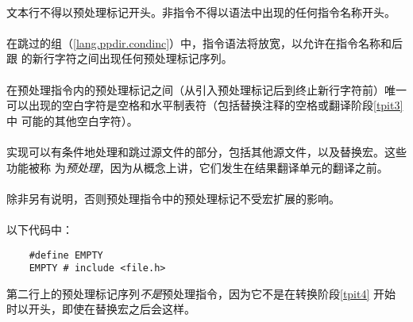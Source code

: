 {\paragraph{}
文本行不得以预处理标记开头。非指令不得以语法中出现的任何指令名称开头。

\paragraph{}
在跳过的组（\ref{lang.ppdir.condinc}）中，指令语法将放宽，以允许在指令名称和后跟
的新行字符之间出现任何预处理标记序列。

\constraint
\paragraph{}
在预处理指令内的预处理标记之间（从引入预处理标记\tm{\#}后到终止新行字符前）唯一
可以出现的空白字符是空格和水平制表符（包括替换注释的空格或翻译阶段\ref{tpit3}中
可能的其他空白字符）。

\semantic
\paragraph{}
实现可以有条件地处理和跳过源文件的部分，包括其他源文件，以及替换宏。这些功能被称
为\textit{预处理}，因为从概念上讲，它们发生在结果翻译单元的翻译之前。

\paragraph{}
除非另有说明，否则预处理指令中的预处理标记不受宏扩展的影响。

\paragraph{}
\ex* 以下代码中：
\begin{lstlisting}
    #define EMPTY
    EMPTY # include <file.h>
\end{lstlisting}
第二行上的预处理标记序列\textit{不是}预处理指令，因为它不是在转换阶段\ref{tpit4}
开始时以\tm{\#}开头，即使在替换宏之后会这样。

\constraint
}
